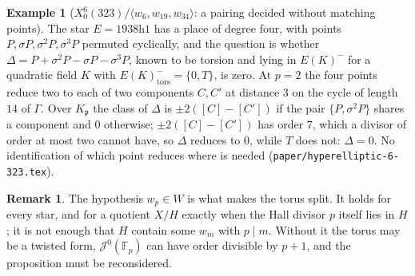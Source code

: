 \documentclass[11pt,reqno]{amsart}
\theoremstyle{plain}
\theoremstyle{definition}
\newtheorem{remark}[theorem]{Remark}
\newtheorem{example}[theorem]{Example}
\newcommand{\F}{\mathbb{F}}
\begin{document}
\begin{example}[$X_0^6(323)/\langle w_6,w_{19},w_{34}\rangle$: a pairing decided without matching points]
The star $E=1938\mathrm{h}1$ has a place of degree four, with points $P,\sigma P,\sigma^2P,\sigma^3P$ permuted
cyclically, and the question is whether $\Delta=P+\sigma^2P-\sigma P-\sigma^3P$, known to be torsion and lying in
$E(K)^-$ for a quadratic field $K$ with $E(K)^-_{\mathrm{tors}}=\{0,T\}$, is zero. At $p=2$ the four points
reduce two to each of two components $C,C'$ at distance $3$ on the cycle of length $14$ of $\Gamma$. Over
$K_{\mathfrak p}$ the class of $\Delta$ is $\pm2([C]-[C'])$ if the pair $\{P,\sigma^2P\}$ shares a component and
$0$ otherwise; $\pm2([C]-[C'])$ has order $7$, which a divisor of order at most two cannot have, so $\Delta$
reduces to $0$, while $T$ does not: $\Delta=0$. No identification of which point reduces where is needed
(\texttt{paper/hyperelliptic-6-323.tex}).
\end{example}

\begin{remark}
The hypothesis $w_p\in W$ is what makes the torus split. It holds for every star, and for a quotient $X/H$
exactly when the Hall divisor $p$ itself lies in $H$; it is not enough that $H$ contain some $w_m$ with $p\mid m$.
Without it the torus may be a twisted form, $\mathcal J^0(\F_p)$ can have order divisible by $p+1$, and the
proposition must be reconsidered.
\end{remark}
\end{document}

